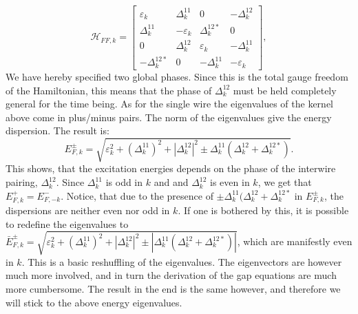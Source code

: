 \begin{equation}
\mathcal{H}_{FF,k} = \begin{bmatrix} \varepsilon_{k}   & \Delta^{11}_k      & 0                 & -\Delta^{12}_{k} \\ 
                                     \Delta^{11}_k     & -\varepsilon_{k}   & \Delta^{12*}_k    & 0 \\ 
                                    0                  & \Delta^{12}_k      & \varepsilon_{k}   & -\Delta^{11}_k \\ 
                                     -\Delta^{12*}_{k} & 0                  & -\Delta^{11}_k     & -\varepsilon_{k} \end{bmatrix},                  
\end{equation}
We have hereby specified two global phases. Since this is the total gauge freedom of the Hamiltonian, this means that the phase of $\Delta^{12}_k$ must be held completely general for the time being. As for the single wire the eigenvalues of the kernel above come in plus/minus pairs. The norm of the eigenvalues give the energy dispersion. The result is:
\begin{equation}
E^{\pm}_{F,k} = \sqrt{\varepsilon^2_k + \left(\Delta^{11}_k\right)^2 + \left|\Delta^{12}_k\right|^2 \pm \Delta^{11}_k(\Delta^{12}_k + \Delta^{12*}_k)}. 
\end{equation} 
This shows, that the excitation energies depends on the phase of the interwire pairing, $\Delta^{12}_k$. Since $\Delta^{11}_k$ is odd in $k$ and and $\Delta^{12}_k$ is even in $k$, we get that $E^{+}_{F,k} = E^{-}_{F,-k}$. Notice, that due to the presence of $\pm \Delta^{11}_k(\Delta^{12}_k + \Delta^{12*}_k$ in $E^{\pm}_{F,k}$, the dispersions are neither even nor odd in $k$. If one is bothered by this, it is possible to redefine the eigenvalues to $\bar{E}^{\pm}_{F,k} = \sqrt{\varepsilon^2_k + \left(\Delta^{11}_k\right)^2 + \left|\Delta^{12}_k\right|^2 \pm |\Delta^{11}_k(\Delta^{12}_k + \Delta^{12*}_k)|}$, which are manifestly even in $k$. This is a basic reshuffling of the eigenvalues. The eigenvectors are however much more involved, and in turn the derivation of the gap equations are much more cumbersome. The result in the end is the same however, and therefore we will stick to the above energy eigenvalues.  

